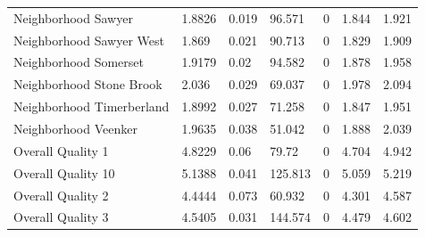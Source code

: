 \documentclass{article}
\begin{document}
\begin{table}[H]
\begin{tabular}{lllllll}
		Neighborhood Sawyer              & 1.8826                    & 0.019                        & 96.571                 & 0                                       & 1.844                         & 1.921                         \\
		Neighborhood Sawyer West         & 1.869                     & 0.021                        & 90.713                 & 0                                       & 1.829                         & 1.909                         \\
		Neighborhood Somerset            & 1.9179                    & 0.02                         & 94.582                 & 0                                       & 1.878                         & 1.958                         \\
		Neighborhood Stone Brook         & 2.036                     & 0.029                        & 69.037                 & 0                                       & 1.978                         & 2.094                         \\
		Neighborhood Timerberland        & 1.8992                    & 0.027                        & 71.258                 & 0                                       & 1.847                         & 1.951                         \\
		Neighborhood Veenker             & 1.9635                    & 0.038                        & 51.042                 & 0                                       & 1.888                         & 2.039                         \\
		Overall Quality 1                & 4.8229                    & 0.06                         & 79.72                  & 0                                       & 4.704                         & 4.942                         \\
		Overall Quality 10               & 5.1388                    & 0.041                        & 125.813                & 0                                       & 5.059                         & 5.219                         \\
		Overall Quality 2                & 4.4444                    & 0.073                        & 60.932                 & 0                                       & 4.301                         & 4.587                         \\
		Overall Quality 3                & 4.5405                    & 0.031                        & 144.574                & 0                                       & 4.479                         & 4.602                         \\

\end{tabular}
\end{table}
\end{document}

